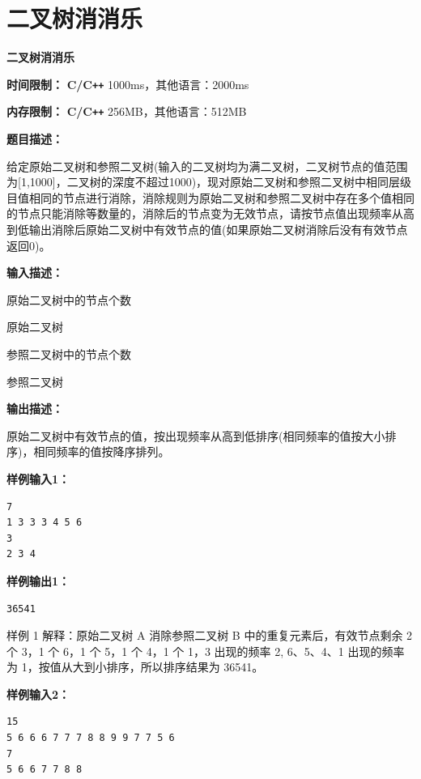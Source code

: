 \documentclass[a4paper]{ctexart}
\begin{document}
	
\section{二叉树消消乐}
	
\begin{center}
	\Large \textbf{二叉树消消乐}
\end{center}
	
\noindent\textbf{时间限制：} \textbf{C/C\texttt{++}} 1000ms，其他语言：2000ms

\noindent\textbf{内存限制：} \textbf{C/C\texttt{++}} 256MB，其他语言：512MB
	
\vspace{10pt}
	
\noindent\textbf{题目描述：}
	
给定原始二叉树和参照二叉树(输入的二叉树均为满二叉树，二叉树节点的值范围为[1,1000]，二叉树的深度不超过1000)，现对原始二叉树和参照二叉树中相同层级目值相同的节点进行消除，消除规则为原始二叉树和参照二叉树中存在多个值相同的节点只能消除等数量的，消除后的节点变为无效节点，请按节点值出现频率从高到低输出消除后原始二叉树中有效节点的值(如果原始二叉树消除后没有有效节点返回0)。
	
\noindent\textbf{输入描述：}
	
原始二叉树中的节点个数

原始二叉树

参照二叉树中的节点个数

参照二叉树
	
\noindent\textbf{输出描述：} 
	
原始二叉树中有效节点的值，按出现频率从高到低排序(相同频率的值按大小排序)，相同频率的值按降序排列。
	
\noindent\textbf{样例输入1：}
	
\lstset{numbers=none}
\begin{lstlisting}
7
1 3 3 3 4 5 6
3
2 3 4
\end{lstlisting}
\lstset{numbers=left}
	
\noindent\textbf{样例输出1：}
\lstset{numbers=none}
\begin{lstlisting}
36541
\end{lstlisting}
\lstset{numbers=left}
	
\noindent 样例 1 解释：原始二叉树 A 消除参照二叉树 B 中的重复元素后，有效节点剩余 2 个 3，1 个 6，1 个 5，1 个 4，1 个 1，3 出现的频率 2, 6、5、4、1 出现的频率为 1，按值从大到小排序，所以排序结果为 36541。

\noindent\textbf{样例输入2：}
\lstset{numbers=none}
\begin{lstlisting}
15
5 6 6 6 7 7 7 8 8 9 9 7 7 5 6
7
5 6 6 7 7 8 8
\end{lstlisting}
\lstset{numbers=left}
	
\end{document}
